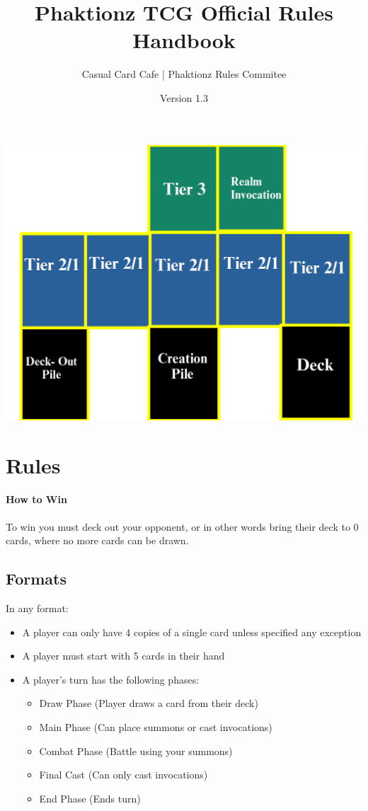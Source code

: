 \documentclass[12pt, letterpaper]{article}
\title{Phaktionz TCG Official Rules Handbook}
\author{Casual Card Cafe | Phaktionz Rules Commitee}
\date{Version 1.3}
\begin{document}
\maketitle
{}
\newpage
\tableofcontents
\newpage
\begin{center}
    \includegraphics[scale = 0.25]{images/field.png}
\end{center}


\section{Rules}
\paragraph{How to Win\\}
To win you must deck out your opponent, or in other words bring their deck to 0 cards, where no more cards can be drawn.
\subsection{Formats}
In any format: 
\begin{itemize}
    \item A player can only have 4 copies of a single card unless specified any exception
    \item A player must start with 5 cards in their hand 
    \item A player's turn has the following phases:
     \begin{itemize}
        \item Draw Phase (Player draws a card from their deck)
        \item Main Phase (Can place summons or cast invocations)
        \item Combat Phase (Battle using your summons)
        \item Final Cast (Can only cast invocations)
        \item End Phase (Ends turn)
     \end{itemize}
\end{itemize}
\end{document}

